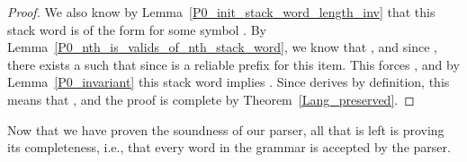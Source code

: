 \begin{isabellebody}
\begin{isamarkuptext}
\begin{theorem}
\begin{proof}
We also know by Lemma~\ref{P0_init_stack_word_length_inv} that this stack word is of the form 
 for some symbol . By Lemma~\ref{P0_nth_is_valids_of_nth_stack_word}, we know 
that , and since , there exists a \isa{{\isasymgamma}} such 
that  since  is a reliable prefix for this item. This forces 
, and by Lemma~\ref{P0_invariant} this stack word implies 
. Since  derives  by definition, this means 
that , and the proof is complete by Theorem~\ref{Lang_preserved}.
\end{proof}
\end{theorem}%
\end{isamarkuptext}\isamarkuptrue%
%
\isadelimdocument
%
\endisadelimdocument
%
\isatagdocument
%
\isamarkuptrue%
%
\endisatagdocument
{\isafolddocument}%
%
\isadelimdocument
%
\endisadelimdocument
%
\isadelimproof
%
\endisadelimproof
%
\isatagproof
%
\endisatagproof
{\isafoldproof}%
%
\isadelimproof
%
\endisadelimproof
%
\begin{isamarkuptext}%
Now that we have proven the soundness of our parser, all that is left is proving its 
completeness, i.e., that every word in the grammar is accepted by the parser.


\end{isamarkuptext}
\end{isabellebody}

